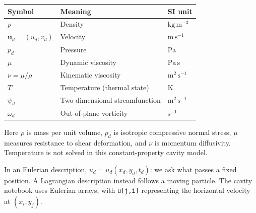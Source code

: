 \documentclass[11pt]{article}
\begin{document}
\begin{center}\begin{tabular}{lll}\toprule
Symbol & Meaning & SI unit\\\midrule
$\rho$ & Density & $\mathrm{kg\,m^{-3}}$\\
$\boldsymbol{u}_d=(u_d,v_d)$ & Velocity & $\mathrm{m\,s^{-1}}$\\
$p_d$ & Pressure & $\mathrm{Pa}$\\
$\mu$ & Dynamic viscosity & $\mathrm{Pa\,s}$\\
$\nu=\mu/\rho$ & Kinematic viscosity & $\mathrm{m^2\,s^{-1}}$\\
$T$ & Temperature (thermal state) & $\mathrm{K}$\\
$\psi_d$ & Two-dimensional streamfunction & $\mathrm{m^2\,s^{-1}}$\\
$\omega_d$ & Out-of-plane vorticity & $\mathrm{s^{-1}}$\\\bottomrule
\end{tabular}\end{center}
Here $\rho$ is mass per unit volume, $p_d$ is isotropic compressive normal stress, $\mu$ measures resistance to shear deformation, and $\nu$ is momentum diffusivity. Temperature is not solved in this constant-property cavity model.

In an Eulerian description, $u_d=u_d(x_d,y_d,t_d)$: we ask what passes a fixed position. A Lagrangian description instead follows a moving particle. The cavity notebook uses Eulerian arrays, with \texttt{u[j,i]} representing the horizontal velocity at $(x_i,y_j)$.
\end{document}

